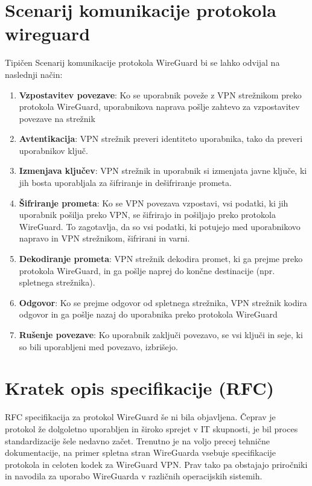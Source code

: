 \documentclass[a4paper, 11pt]{article}
\begin{document}
\section{Scenarij komunikacije protokola wireguard}
Tipičen Scenarij komunikacije protokola WireGuard bi se lahko odvijal na naslednji način:

\begin{enumerate}
    \item \textbf{Vzpostavitev povezave}: Ko se uporabnik poveže z VPN strežnikom preko protokola WireGuard, uporabnikova naprava pošlje zahtevo za vzpostavitev povezave na strežnik
    \item \textbf{Avtentikacija}: VPN strežnik preveri identiteto uporabnika, tako da preveri uporabnikov ključ.
    \item \textbf{Izmenjava ključev}: VPN strežnik in uporabnik si izmenjata javne ključe, ki jih bosta uporabljala za šifriranje in dešifriranje prometa.
    \item \textbf{Šifriranje prometa}: Ko se VPN povezava vzpostavi, vsi podatki, ki jih uporabnik pošilja preko VPN, se šifrirajo in pošiljajo preko protokola WireGuard. To zagotavlja, da so vsi podatki, ki potujejo med uporabnikovo napravo in VPN strežnikom, šifrirani in varni.
    \item \textbf{Dekodiranje prometa}: VPN strežnik dekodira promet, ki ga prejme preko protokola WireGuard, in ga pošlje naprej do končne destinacije (npr. spletnega strežnika).
    \item \textbf{Odgovor}: Ko se prejme odgovor od spletnega strežnika, VPN strežnik kodira odgovor in ga pošlje nazaj do uporabnika preko protokola WireGuard
    \item \textbf{Rušenje povezave}: Ko uporabnik zaključi povezavo, se vsi ključi in seje, ki so bili uporabljeni med povezavo, izbrišejo.
\end{enumerate}

\pagebreak

\section{Kratek opis specifikacije (RFC)}
RFC specifikacija za protokol WireGuard še ni bila objavljena. Čeprav je protokol že dolgoletno uporabljen in široko sprejet v IT skupnosti, je bil proces standardizacije šele nedavno začet.
Trenutno je na voljo precej tehnične dokumentacije, na primer spletna stran WireGuarda vsebuje specifikacije protokola in celoten kodek za WireGuard VPN. Prav tako pa obstajajo priročniki in navodila za uporabo WireGuarda v različnih operacijskih sistemih.
\pagebreak
\end{document}
